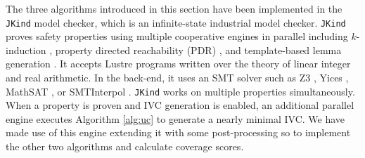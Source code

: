 The three algorithms introduced in this section have been implemented in the \texttt{JKind} \cite{jkind} model checker, which is an infinite-state industrial model checker. \texttt{JKind} proves safety properties using multiple cooperative engines in parallel including $k$-induction \cite{SheeranSS00}, property directed reachability (PDR) \cite{Een2011:PDR}, and template-based lemma generation \cite{Kahsai2011}. It accepts
Lustre programs written over the theory of linear integer and real
arithmetic. In the back-end, it uses an SMT solver such as
Z3 \cite{DeMoura08:z3}, Yices \cite{Dutertre06:yices},
MathSAT \cite{Cimatti2013:MathSAT}, or SMTInterpol \cite{Christ2012:SMTInterpol}.
\texttt{JKind} works on multiple properties simultaneously. When a
property is proven and IVC generation is enabled, an additional
parallel engine executes Algorithm \ref{alg:uc} to generate a nearly minimal
IVC. 
We have made use of this engine extending it with some post-processing so to implement the other two algorithms and calculate coverage scores.


